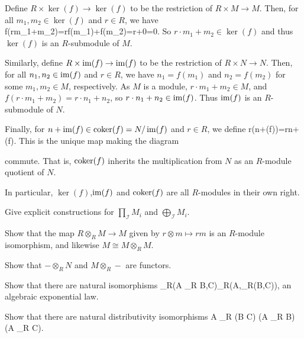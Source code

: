 \bs
Define $R\times \ker(f)\to\ker(f)$ to be the restriction of $R\times M\to M$. Then, for all $m_1,m_2\in\ker(f)$ and $r\in R$, we have
\bse
f(r\cdot m_1+m_2)=r\cdot f(m_1)+f(m_2)=r+0=0.
\ese
So $r\cdot m_1+m_2\in \ker(f)$ and thus $\ker(f)$ is an $R$-submodule of $M$.

Similarly, define $R\times \operatorname{im}(f)\to\operatorname{im}(f)$ to be the restriction of $R\times N\to N$. Then, for all $n_1,n_2\in\operatorname{im}(f)$ and $r\in R$, we have $n_1=f(m_1)$ and $n_2=f(m_2)$ for some $m_1,m_2\in M$, respectively. As $M$ is a module, $r\cdot m_1+m_2\in M$, and $f(r\cdot m_1+m_2)=r\cdot n_1+n_2$, so $r\cdot n_1+n_2 \in \operatorname{im}(f)$. Thus $\operatorname{im}(f)$ is an $R$-submodule of $N$.

Finally, for $n+\operatorname{im}(f)\in\operatorname{coker}(f)=N/\operatorname{im}(f)$ and $r\in R$, we define
\bse
r\cdot(n+\im(f))=r\cdot n+\im(f).
\ese
This is the unique map making the diagram
\bse
{}
\ese
commute. That is, $\operatorname{coker}(f)$ inherits the multiplication from $N$ as an $R$-module quotient of $N$.

In particular, $\ker(f)$,$\operatorname{im}(f)$ and $\operatorname{coker}(f)$ are all $R$-modules in their own right.
\es

\bp
Give explicit constructions for $\prod_{\mathcal{I}} M_i$ and $\bigoplus_{\mathcal{I}} M_i$.
\ep

\bs
\es

\bp
\ben[label=(\alph*)]
\item Show that the map $R\otimes_R M \to M$ given by $r\otimes m \mapsto rm$ is an $R$-module isomorphism, and likewise $M\cong
M \otimes_R M$.
\item Show that $-\otimes_R N$ and $M \otimes_R -$ are functors.
\item Show that there are natural isomorphisms
\bse
\Hom_R(A \otimes_R B,C)\cong \Hom_R(A,\Hom_R(B,C)),
\ese
an algebraic exponential law.
\item Show that there are natural distributivity isomorphisms
\bse
A \otimes_R (B \oplus C) \cong (A \otimes_R B) \oplus (A \otimes_R C).
\ese
\een
\ep

\bs
\ben[label=(\alph*)]
\item 
\item 
\item 
\item 
\een
\es

